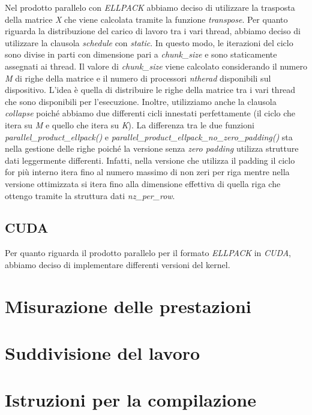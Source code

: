 \documentclass{article}
\begin{document}
Nel prodotto parallelo con \textit{ELLPACK} abbiamo deciso di utilizzare la trasposta della matrice \textit{X} che viene calcolata tramite la funzione \textit{transpose}. Per quanto riguarda la distribuzione del carico di lavoro tra i vari thread, abbiamo deciso di utilizzare la clausola \textit{schedule} con \textit{static}. In questo modo, le iterazioni del ciclo sono divise in parti con dimensione pari a \textit{chunk\_size} e sono staticamente assegnati ai thread. Il valore di \textit{chunk\_size} viene calcolato considerando il numero \textit{M} di righe della matrice e il numero di processori \textit{ntherad} disponibili sul dispositivo. L'idea è quella di distribuire le righe della matrice tra i vari thread che sono disponibili per l'esecuzione. Inoltre, utilizziamo anche la clausola \textit{collapse} poiché abbiamo due differenti cicli innestati perfettamente (il ciclo che itera su \textit{M} e quello che itera su \textit{K}). La differenza tra le due funzioni \textit{parallel\_product\_ellpack()} e \textit{parallel\_product\_ellpack\_no\_zero\_padding()} sta nella gestione delle righe poiché la versione senza \textit{zero padding} utilizza strutture dati leggermente differenti. Infatti, nella versione che utilizza il padding il ciclo for più interno itera fino al numero massimo di non zeri per riga mentre nella versione ottimizzata si itera fino alla dimensione effettiva di quella riga che ottengo tramite la struttura dati \textit{nz\_per\_row}.

\subsection{CUDA}
Per quanto riguarda il prodotto parallelo per il formato \textit{ELLPACK} in \textit{CUDA}, abbiamo deciso di implementare differenti versioni del kernel.

\section{Misurazione delle prestazioni}

\section{Suddivisione del lavoro}

\section{Istruzioni per la compilazione}
\end{document}
